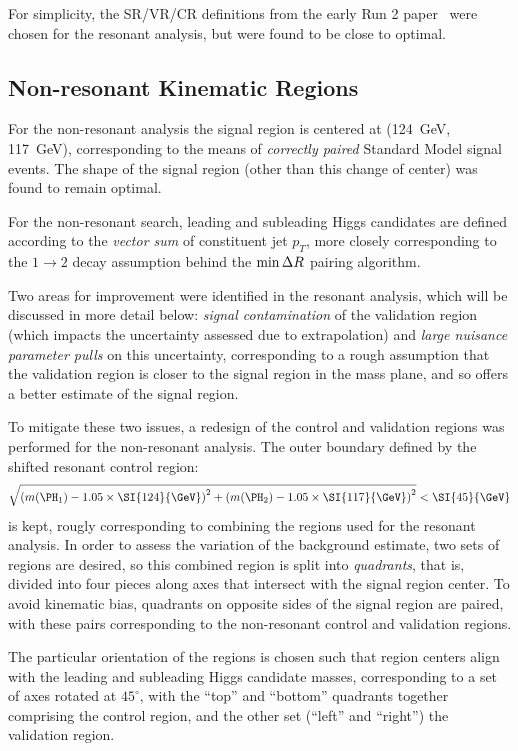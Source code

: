 For simplicity, the SR/VR/CR definitions from the early Run 2 paper~\cite{EXOT-2016-31} were chosen 
for the resonant analysis, but were found to be close to optimal.

\subsection{Non-resonant Kinematic Regions}
For the non-resonant analysis the signal region is centered at (\SI{124}{\GeV}, \SI{117}{\GeV}),
corresponding to the means of \emph{correctly paired} Standard Model signal events. The shape of 
the signal region (other than this change of center) was found to remain optimal.

For the non-resonant search, leading and subleading Higgs candidates are defined according to the 
\emph{vector sum} of constituent jet $p_{T}$, more closely corresponding to the $1\rightarrow 2$ decay assumption
behind the $\min{\ensuremath{\Delta R}}$ pairing algorithm. 

Two areas for improvement were identified in the resonant analysis, which will be discussed in more detail below: 
\emph{signal contamination} of the validation region (which impacts the uncertainty assessed due to extrapolation)
and \emph{large nuisance parameter pulls} on this uncertainty, corresponding to a rough assumption that the 
validation region is closer to the signal region in the mass plane, and so offers a better estimate of the 
signal region.

To mitigate these two issues, a redesign of the control and validation regions was performed for 
the non-resonant analysis. The outer boundary defined by the shifted resonant control region:
\begin{equation}
	\label{eqn:ctrl-reg-def}
	\sqrt{\qty(\mh1 - 1.05 \times \SI{124}{\GeV})^{2} + \qty(\mh2 - 1.05 \times
		\SI{117}{\GeV})^{2}} < \SI{45}{\GeV}
\end{equation}
is kept, rougly corresponding to combining the regions used for the resonant analysis. In order 
to assess the variation of the background estimate, two sets of regions are desired, so this combined 
region is split into \emph{quadrants}, that is, divided into four pieces along axes that intersect 
with the signal region center. To avoid kinematic bias, quadrants on opposite sides of the signal 
region are paired, with these pairs corresponding to the non-resonant control and validation regions.

The particular orientation of the regions is chosen such that region centers align with the leading
and subleading Higgs candidate masses, corresponding to a set of axes rotated at $45^{\circ}$, with the ``top''
and ``bottom'' quadrants together comprising the control region, and the other set (``left'' and ``right'')
the validation region.

